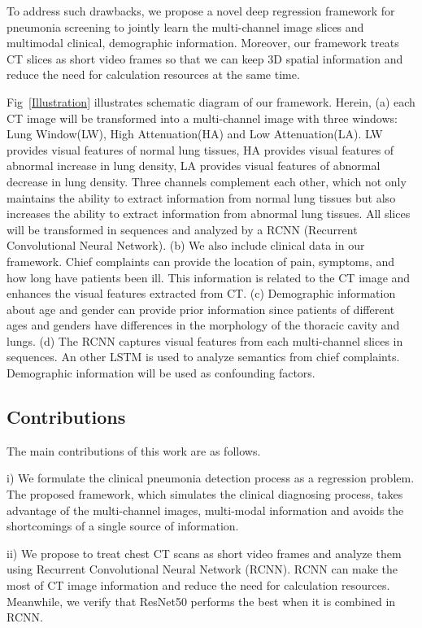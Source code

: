 \documentclass[journal]{IEEEtran}
\begin{document}
To address such drawbacks, we propose a novel deep regression framework for pneumonia screening to jointly learn the multi-channel image slices and multimodal clinical, demographic information. Moreover, our framework treats CT slices as short video frames so that we can keep 3D spatial information and reduce the need for calculation resources at the same time.



Fig~\ref{Illustration} illustrates schematic diagram of our framework.
Herein, (a) each CT image will be transformed into a multi-channel image with three windows: Lung Window(LW), High Attenuation(HA) and Low Attenuation(LA). LW provides visual features of normal lung tissues, HA provides visual features of abnormal increase in lung density, LA provides visual features of abnormal decrease in lung density. Three channels complement each other, which not only maintains the ability to extract information from normal lung tissues but also increases the ability to extract information from abnormal lung tissues. All slices will be transformed in sequences and analyzed by a RCNN (Recurrent Convolutional Neural Network).
(b) We also include clinical data in our framework. Chief complaints can provide the location of pain, symptoms, and how long have patients been ill. This information is related to the CT image and enhances the visual features extracted from CT. 
(c) Demographic information about age and gender can provide prior information since patients of different ages and genders have differences in the morphology of the thoracic cavity and lungs. 
(d) The RCNN captures visual features from each multi-channel slices in sequences. An other LSTM is used to analyze semantics from chief complaints. Demographic information will be used as confounding factors. 

\subsection{Contributions}
The main contributions of this work are as follows.

i) We formulate the clinical pneumonia detection process as a regression problem. The proposed framework, which simulates the clinical diagnosing process, takes advantage of the multi-channel images, multi-modal information and avoids the shortcomings of a single source of information.

ii) We propose to treat chest CT scans as short video frames and analyze them using Recurrent Convolutional Neural Network (RCNN). RCNN can make the most of CT image information and reduce the need for calculation resources. Meanwhile, we verify that ResNet50 performs the best when it is combined in RCNN.
\end{document}
